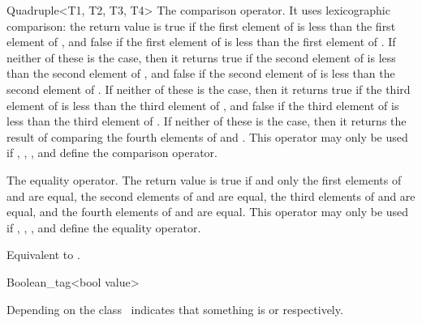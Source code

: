 \begin{ccRefClass}{Quadruple<T1, T2, T3, T4>}
   {The comparison operator. It uses lexicographic comparison:
    the return value is true if the first element of  is less
    than the first element of , and false if the first element
    of  is less than the first element of . If neither
    of these is the case, then it returns true if the second element
    of  is less than the second element of , and false
    if the second element of  is less than the second element
    of . If neither of these is the case, then it returns true
    if the third element of  is less than the third element of
    , and false if the third element of  is less than
    the third element of .  If neither of these is the case,
    then it returns the result of comparing the fourth elements of
     and . This operator may only be used if ,
    , , and  define the comparison operator.}
  
   {The equality operator. The return value is true if and only
    the first elements of  and  are equal, the second
    elements of  and  are equal, the third elements of
     and  are equal, and the fourth elements of 
    and  are equal.  This operator may only be used if
    , , , and  define the equality
    operator.}
  
  {Equivalent to .}

\end{ccRefClass}


\begin{ccRefClass}{Boolean_tag<bool value>}

\ccDefinition

Depending on  the class \ccRefName\ indicates that
something is  or  respectively.


\ccConstants


\ccSeeAlso
{} \\

\end{ccRefClass}


